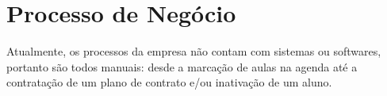 \section[Processo de Negócio]{Processo de Negócio}
Atualmente, os processos da empresa não contam com sistemas ou softwares, portanto são todos manuais: desde a marcação de aulas na agenda até a contratação de um plano de contrato e/ou inativação de um aluno.
